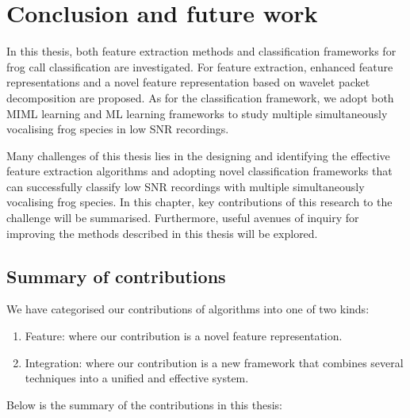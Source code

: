 
\chapter[Conclusion]{Conclusion and future work}
\label{cha:cha8Conclusions}

In this thesis, both feature extraction methods and classification frameworks for frog call classification are investigated. For feature extraction, enhanced feature representations and a novel feature representation based on wavelet packet decomposition are proposed. As for the classification framework, we adopt both MIML learning and ML learning frameworks to study multiple simultaneously vocalising frog species in low SNR recordings. 

Many challenges of this thesis lies in the designing and identifying the effective feature extraction algorithms and adopting novel classification frameworks that can successfully classify low SNR recordings with multiple simultaneously vocalising frog species. 
In this chapter, key contributions of this research to the challenge will be summarised. Furthermore, useful avenues of inquiry for improving the methods described in this thesis will be explored.

\section{Summary of contributions}
	
We have categorised our contributions of algorithms into one of two kinds:

\begin{enumerate}
\item Feature: where our contribution is a novel feature representation.

\item Integration: where our contribution is a new framework that combines several techniques into a unified and effective system.
\end{enumerate}

Below is the summary of the contributions in this thesis:

